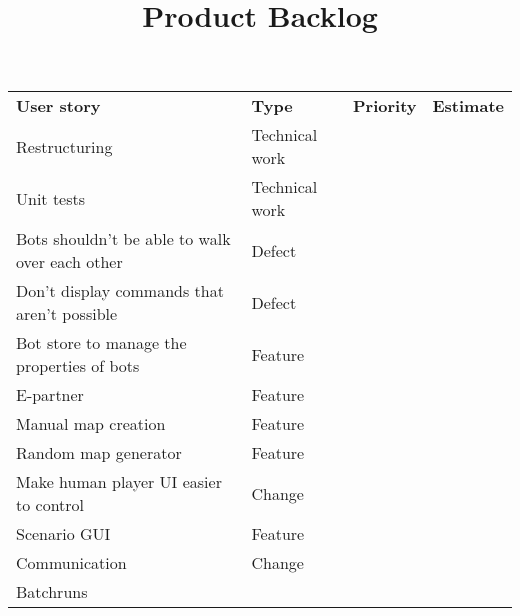 \documentclass{article}
\begin{document}
\title{Product Backlog}
\date{}
\maketitle

\begin{tabular}{l l l l}
\textbf{User story} & \textbf{Type} & \textbf{Priority} & \textbf{Estimate}\\
Restructuring & Technical work & &\\
Unit tests & Technical work & &\\
Bots shouldn't be able to walk over each other & Defect & &\\
Don't display commands that aren't possible & Defect & &\\
Bot store to manage the properties of bots & Feature & &\\
E-partner & Feature & &\\
Manual map creation & Feature & &\\
Random map generator & Feature & &\\
Make human player UI easier to control & Change & &\\
Scenario GUI & Feature & &\\
Communication & Change & & \\
Batchruns & & &\\
\end{tabular}
\end{document}
